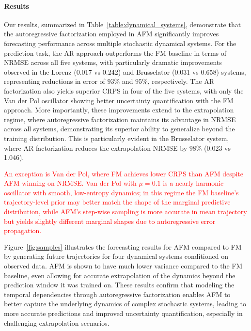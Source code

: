 \documentclass[a4paper,10pt,twocolumn,preprint,3p]{elsarticle}
\begin{document}
\paragraph{Results}
Our results, summarized in Table~\ref{table:dynamical_systems}, demonstrate that the autoregressive factorization employed in AFM significantly improves forecasting performance across multiple stochastic dynamical systems. For the prediction task, the AR approach outperforms the FM baseline in terms of NRMSE across all five systems, with particularly dramatic improvements observed in the Lorenz (0.017 vs 0.242) and Brusselator (0.031 vs 0.658) systems, representing reductions in error of $93\%$ and $95\%$, respectively. The AR factorization also yields superior CRPS in four of the five systems, with only the Van der Pol oscillator showing better uncertainty quantification with the FM approach. More importantly, these improvements extend to the extrapolation regime, where autoregressive factorization maintains its advantage in NRMSE across all systems, demonstrating its superior ability to generalize beyond the training distribution. This is particularly evident in the Brusselator system, where AR factorization reduces the extrapolation NRMSE by $98\%$ (0.023 vs 1.046). 


\textcolor{red}{An exception is Van der Pol, where FM achieves lower CRPS than AFM despite AFM winning on NRMSE. Van der Pol with $\mu=0.1$ is a nearly harmonic oscillator with smooth, low-entropy dynamics; in this regime the FM baseline's trajectory-level prior may better match the shape of the marginal predictive distribution, while AFM's step-wise sampling is more accurate in mean trajectory but yields slightly different marginal shapes due to autoregressive error propagation.} %

Figure~\ref{fig:samples} illustrates the forecasting results for AFM compared to FM by generating future trajectories for four dynamical systems conditioned on observed data. AFM is shown to have much lower variance compared to the FM baseline, even allowing for accurate extrapolation of the dynamics beyond the prediction window it was trained on. These results confirm that modeling the temporal dependencies through autoregressive factorization enables AFM to better capture the underlying dynamics of complex stochastic systems, leading to more accurate predictions and improved uncertainty quantification, especially in challenging extrapolation scenarios.
\end{document}
